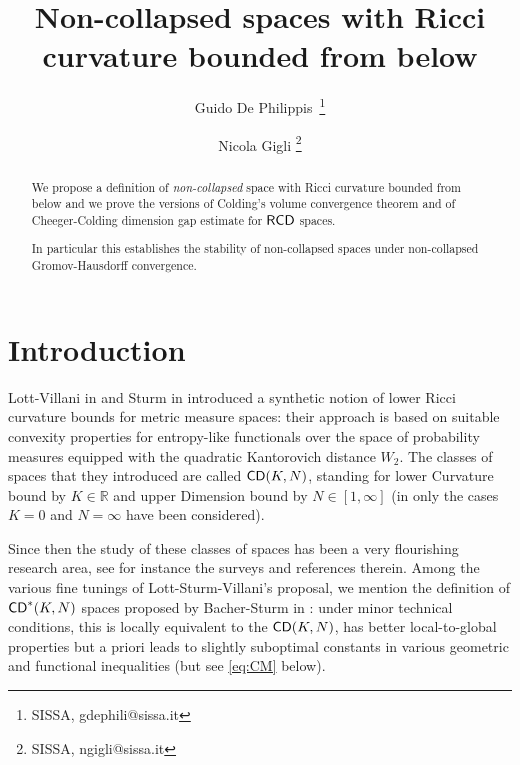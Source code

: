 \documentclass[reqno,11pt]{article}
\title{Non-collapsed spaces with Ricci curvature bounded from below}
\numberwithin{equation}{section}
\newcommand{\R}{\mathbb{R}}
\newcommand{\CD}{{\sf CD}}
\begin{document}
\author{ Guido De Philippis\ \thanks{SISSA, gdephili@sissa.it}  \and
   Nicola Gigli
   \thanks{SISSA, ngigli@sissa.it}}
   



\maketitle

\begin{abstract}
We propose a definition of {\em non-collapsed} space with Ricci curvature bounded from below and we prove the versions of Colding's volume convergence theorem and of Cheeger-Colding dimension gap estimate for ${\sf RCD}$ spaces. 

In particular this establishes the stability of non-collapsed spaces under non-collapsed Gromov-Hausdorff convergence. 


\end{abstract}


\tableofcontents



\section{Introduction}
Lott-Villani in \cite{Lott-Villani09} and Sturm in \cite{Sturm06I,Sturm06II} introduced a synthetic notion of lower Ricci curvature bounds for metric measure spaces: their approach is based on suitable convexity properties for entropy-like functionals over the space of probability measures equipped with the quadratic Kantorovich distance $W_2$. The classes of spaces that they introduced are called $\CD(K,N)$, standing for lower Curvature bound by $K\in\R$ and upper Dimension bound by $N\in[1,\infty]$ (in  \cite{Lott-Villani09}  only the cases $K=0$  and $N=\infty$ have been considered). 

Since then the study of these classes of spaces has been a very flourishing research area, see for instance the surveys \cite{Villani2016,Villani2017} and references therein. Among the various fine tunings of Lott-Sturm-Villani's proposal, we mention the definition of $\CD^*(K,N)$ spaces proposed by Bacher-Sturm in \cite{BacherSturm10}: under minor technical conditions, this is locally equivalent to the $\CD(K,N)$, has better local-to-global properties but a priori leads to slightly suboptimal constants in various geometric and functional inequalities (but see \eqref{eq:CM} below).
\end{document}
